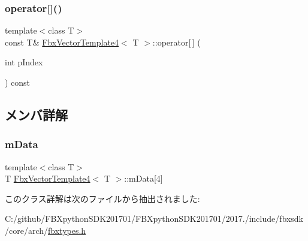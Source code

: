 \mbox{\label{class_fbx_vector_template4_ac4c8037ce6a79dc4687946edc4fb527f}} 
\subsubsection{\texorpdfstring{operator[]()}{operator[]()}\hspace{0.1cm}{\footnotesize\ttfamily [2/2]}}
{\footnotesize\ttfamily template$<$class T$>$ \\
const T\& \hyperlink{class_fbx_vector_template4}{Fbx\+Vector\+Template4}$<$ T $>$\+::operator\mbox{[}$\,$\mbox{]} (\begin{DoxyParamCaption}\item[{int}]{p\+Index }\end{DoxyParamCaption}) const}



\subsection{メンバ詳解}
\mbox{\label{class_fbx_vector_template4_a8876bb35672f5ce31c297654122dace5}} 
\subsubsection{\texorpdfstring{m\+Data}{mData}}
{\footnotesize\ttfamily template$<$class T$>$ \\
T \hyperlink{class_fbx_vector_template4}{Fbx\+Vector\+Template4}$<$ T $>$\+::m\+Data\mbox{[}4\mbox{]}}



このクラス詳解は次のファイルから抽出されました\+:\begin{DoxyCompactItemize}
\item 
C\+:/github/\+F\+B\+Xpython\+S\+D\+K201701/\+F\+B\+Xpython\+S\+D\+K201701/2017./include/fbxsdk/core/arch/\hyperlink{fbxtypes_8h}{fbxtypes.\+h}\end{DoxyCompactItemize}
